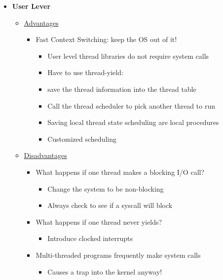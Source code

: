 \documentclass[a4paper]{article}
\begin{document}
\begin{itemize}
  \item {\bf User Lever}
    \begin{itemize}
      \item \underline{Advantages}
        \begin{itemize}
          \item Fast Context Switching: keep the OS out of it!
          \begin{itemize}
            \item User level thread libraries do not require system calls
            \item Have to use thread-yield:
                \item save the thread information into the thread table
                \item Call the thread scheduler to pick another thread to run
            \item Saving local thread state scheduling are local procedures
            \item Customized scheduling
          \end{itemize}
        \end{itemize}
      \item \underline{Disadvantages}
        \begin{itemize}
          \item What happens if one thread makes a blocking I/O call?
            \begin{itemize}
              \item Change the system to be non-blocking
              \item Always check to see if a syscall will block
            \end{itemize}
          \item What happens if one thread never yields?
            \begin{itemize}
              \item Introduce clocked interrupts
            \end{itemize}
          \item Multi-threaded programs frequently make system calls
            \begin{itemize}
              \item Causes a trap into the kernel anyway!
            \end{itemize}
        \end{itemize}
    \end{itemize}

\end{itemize}
\end{document}
